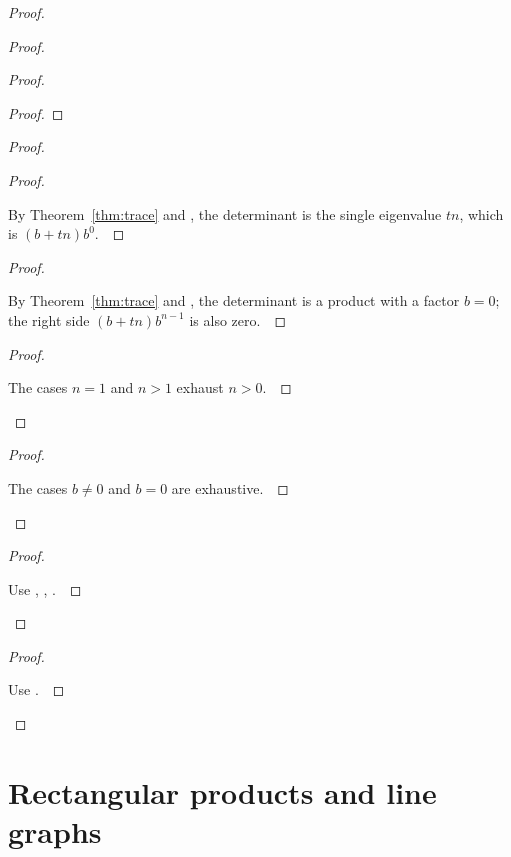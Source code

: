 \documentclass[11pt]{amsart}
\let\qed\relax
\theoremstyle{definition}
\begin{document}
\begin{proof}
\begin{proof}
\begin{proof}
\begin{proof}
\end{proof}
\begin{proof}
\begin{proof}
\pf\ \raggedright By Theorem~\ref{thm:trace} and , the determinant is the single eigenvalue $tn$, which is $(b+tn)b^0$.~\qed
\end{proof}
\begin{proof}
\pf\ \raggedright By Theorem~\ref{thm:trace} and , the determinant is a product with a factor $b=0$; the right side $(b+tn)b^{n-1}$ is also zero.~\qed
\end{proof}
\qedstep
\begin{proof}
\pf\ \raggedright The cases $n=1$ and $n>1$ exhaust $n>0$.~\qed
\end{proof}
\end{proof}
\qedstep
\begin{proof}
\pf\ \raggedright The cases $b\ne0$ and $b=0$ are exhaustive.~\qed
\end{proof}
\end{proof}
\qedstep
\begin{proof}
\pf\ \raggedright Use , , .~\qed
\end{proof}
\end{proof}
\qedstep
\begin{proof}
\pf\ \raggedright Use .~\qed
\end{proof}
\end{proof}

\section{Rectangular products and line graphs}
\end{document}
